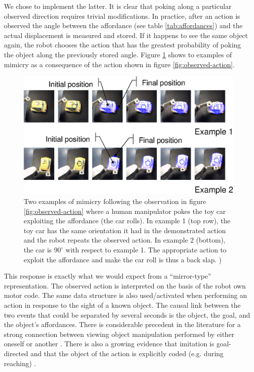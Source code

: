 We chose to implement the latter. It is clear that poking along a particular 
observed direction requires trivial modifications. In practice, after an 
action is observed the angle between the affordance (see table \ref{tab:affordances}) and
the actual displacement is measured and stored. If it happens to see the same 
object again, the robot chooses the action that has the greatest 
probability of poking the object along the previously stored angle. 
Figure \ref{fig:mimicked-action} shows to examples of mimicry as a consequence of the
action shown in figure \ref{fig:observed-action}.

\begin{figure}[tbh]
\begin{center}
\includegraphics[width=\columnwidth]{mimicked-action.eps}
\caption{ 
\label{fig:mimicked-action}
%
Two examples of mimicry following the observation in figure \ref{fig:observed-action} 
where a human manipulator pokes the toy car exploiting the affordance (the car rolls). 
In example 1 (top row), the toy car has the same orientation it had in the
demonstrated action and the robot repeats the observed action. In example 2 (bottom), 
the car is $90^\circ$ with respect to example 1. The appropriate action to exploit
the affordance and make the car roll is thus a back slap.
) 
%
}
\end{center}
\end{figure}

This response is exactly what we would expect from a ``mirror-type'' representation.
The observed action is interpreted on the basis of the robot own motor code. The same
data structure is also used/activated when performing an action in response to the
sight of a known object. The causal link between the two events that could be separated
by several seconds is the object, the goal, and the object's affordances. There is 
considerable precedent in the literature for a strong connection between viewing 
object manipulation performed by either oneself or another \cite{wohlsclager02human}.
There is also a growing evidence that imitation is goal-directed 
\cite{bekkering-wohlschlager-2000} and that the object of the action is explicitly 
coded (e.g. during reaching) \cite{woodward-1998}.


